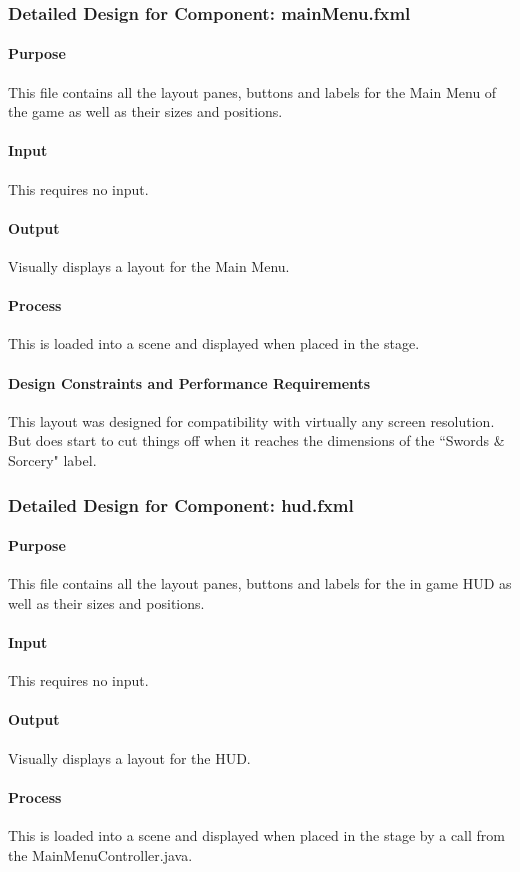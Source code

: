 \documentclass[12pt,a4paper,titlepage]{article}
\begin{document}
\subsubsection{Detailed Design for Component: mainMenu.fxml}
\paragraph{Purpose}  This file contains all the layout panes, buttons and labels for the Main Menu of the game as well as their sizes and positions.
\paragraph{Input} This requires no input.
\paragraph{Output} Visually displays a layout for the Main Menu.
\paragraph{Process} This is loaded into a scene and displayed when placed in the stage.
\paragraph{Design Constraints and Performance Requirements}	This layout was designed for compatibility with virtually any screen resolution.  But does start to cut things off when it reaches the dimensions of the ``Swords \& Sorcery" label.

\subsubsection{Detailed Design for Component: hud.fxml}
\paragraph{Purpose} This file contains all the layout panes, buttons and labels for the in game HUD as well as their sizes and positions.
\paragraph{Input} This requires no input.
\paragraph{Output} Visually displays a layout for the HUD.
\paragraph{Process} This is loaded into a scene and displayed when placed in the stage by a call from the MainMenuController.java.
\end{document}
